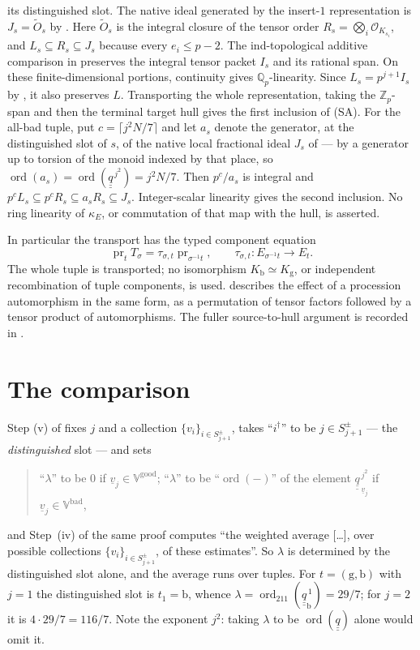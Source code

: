 \documentclass[11pt]{article}
\theoremstyle{plain}
\theoremstyle{definition}
\newcommand{\Vbad}{\mathbb{V}^{\mathrm{bad}}}
\newcommand{\Vgood}{\mathbb{V}^{\mathrm{good}}}
\newcommand{\SA}{\textup{(SA)}}
\newcommand{\ord}{\operatorname{ord}}
\begin{document}
its distinguished slot.  The native ideal generated by the insert-$1$
representation is $J_s=\widetilde O_s$ by
\cite[Prop.~3.1(ii), Prop.~3.4, Example~3.6(ii), Prop.~3.7(v), Def.~3.8(i)]{IUT3}.
Here $\widetilde O_s$ is the integral closure of the tensor order
$R_s=\bigotimes_i\mathcal O_{K_{s_i}}$, and
$L_s\subseteq R_s\subseteq J_s$ because every $e_i\le p-2$.
The ind-topological additive comparison in
\cite[Prop.~3.2, Thm.~3.11(ii)(a)]{IUT3} preserves the integral tensor
packet $I_s$ and its rational span.  On these finite-dimensional portions,
continuity gives $\mathbb Q_p$-linearity.  Since
$L_s=p^{j+1}I_s$ by \cite[Rem.~1.2.2(i)]{IUT3}, it also preserves $L$.
Transporting the whole representation, taking the $\mathbb Z_p$-span and
then the terminal target hull gives the first inclusion of \SA{}.
For the all-bad tuple, put $c=\lceil j^2N/7\rceil$ and let $a_s$ denote the
generator, at the distinguished slot of $s$, of the native local fractional ideal
$J_s$ of \cite[Prop.~3.7(v)]{IUT3} --- by \cite[Def.~3.8(i)]{IUT3} a generator up
to torsion of the monoid indexed by that place, so
$\ord(a_s)=\ord(\underline{\underline q}^{\,j^2})=j^2N/7$.  Then $p^c/a_s$ is
integral and
$p^cL_s\subseteq p^cR_s\subseteq a_sR_s\subseteq J_s$.
Integer-scalar linearity gives the second inclusion.  No ring linearity
of $\kappa_E$, or commutation of that map with the hull, is asserted.

In particular the transport has the typed component equation
\[
 \operatorname{pr}_tT_\sigma
 =\tau_{\sigma,t}\operatorname{pr}_{\sigma^{-1}t},\qquad
 \tau_{\sigma,t}:E_{\sigma^{-1}t}\longrightarrow E_t.
\]
The whole tuple is transported; no isomorphism $K_{\mathrm b}\simeq
K_{\mathrm g}$, or independent recombination of tuple components, is used.
\cite[\S4.6]{DH20} describes the effect of a procession automorphism in the same
form, as a permutation of tensor factors followed by a tensor product of
automorphisms.
The fuller source-to-hull argument is recorded in \cite[\S\S7--8]{Firstfull}.

\section{The comparison}\label{s:cmp}

Step (v) of \cite[Thm.~1.10]{IUT4} fixes $j$ and a collection
$\{v_i\}_{i\in S^\pm_{j+1}}$, takes ``$i^\dagger$'' to be $j\in S^\pm_{j+1}$ --- the
\emph{distinguished} slot --- and sets
\begin{quote}
``$\lambda$'' to be $0$ if $\underline v_j\in\Vgood$; ``$\lambda$'' to be
``$\ord(-)$'' of the element $\underline{\underline q}_{\,\underline v_j}^{\,j^2}$
if $\underline v_j\in\Vbad$,
\end{quote}
and Step~(iv) of the same proof computes ``the weighted average [\dots], over
possible collections $\{v_i\}_{i\in S^\pm_{j+1}}$, of these estimates''.  So $\lambda$ is determined by
the distinguished slot alone, and the average runs over tuples.  For
$t=(\mathrm{g},\mathrm{b})$ with $j=1$ the distinguished slot is $t_1=\mathrm{b}$,
whence $\lambda=\ord_{211}(\underline{\underline q}_{\mathrm{b}}^{\,1})=29/7$; for
$j=2$ it is $4\cdot29/7=116/7$.  Note the exponent $j^2$: taking $\lambda$ to be
$\ord(\underline{\underline q})$ alone would omit it.
\end{document}
